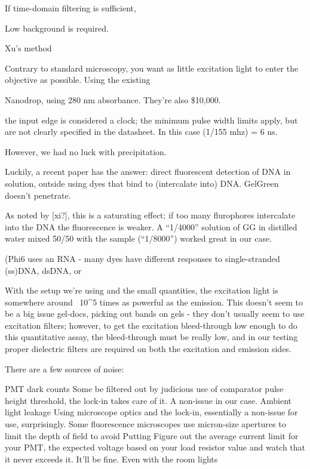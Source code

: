 \documentclass[paper.tex]{subfiles}
\begin{document}
If time-domain filtering is sufficient, 

Low background is required.

Xu's method \cite{Quantification2020}


Contrary to standard microscopy, you want as little excitation light to enter the objective as possible. Using the existing 



Nanodrop, using 280 nm absorbance. They're also \$10,000.




the input edge is considered a clock; the minimum pulse width limits apply, but are not clearly specified in the datasheet. In this case (1/155 mhz) = 6 ns.

However, we had no luck with precipitation.


Luckily, a recent paper has the answer: direct fluorescent detection of DNA in solution, outside using dyes that bind to (intercalate into) DNA. GelGreen doesn’t penetrate.



As noted by [xi?], this is a saturating effect; if too many flurophores intercalate into the DNA the fluorescence is weaker. A “1/4000” solution of GG in distilled water mixed 50/50 with the sample (“1/8000”) worked great in our case.

(Phi6 uses an RNA - many dyes have different responses to single-stranded (ss)DNA, dsDNA, or 





With the setup we’re using and the small quantities, the excitation light is somewhere around ~10^5 times as powerful as the emission. This doesn’t seem to be a big issue gel-docs, picking out bands on gels - they don’t usually seem to use excitation filters; however, to get the excitation bleed-through low enough to do this quantitative assay, the bleed-through must be really low, and in our testing proper dielectric filters are required on both the excitation and emission sides. 

There are a few sources of noise:

PMT dark counts
Some be filtered out by judicious use of comparator pulse height threshold, the lock-in takes care of it. A non-issue in our case.
Ambient light leakage
Using microscope optics and the lock-in, essentially a non-issue for use, surprisingly. Some fluorescence microscopes use micron-size apertures to limit the depth of field to avoid Putting 
Figure out the average current limit for your PMT, the expected voltage based on your load resistor value and watch that it never exceeds it. It’ll be fine. Even with the room lights
\end{document}
